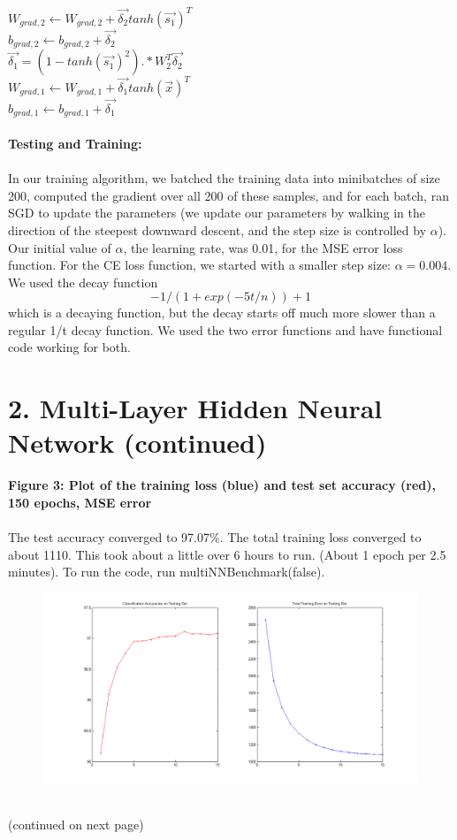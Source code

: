 \documentclass[11pt]{article}
\begin{document}
$ W_{grad, 2} \leftarrow W_{grad,2} + \vec{\delta_{2}} tanh(\vec{s_1})^T $ \\
$ b_{grad, 2} \leftarrow b_{grad,2} + \vec{\delta_{2}} $ \\
$ \vec{\delta_1} = (1 - tanh(\vec{s_1})^2) .* W_{2}^T \vec{\delta_{2}} $ \\
$ W_{grad, 1} \leftarrow W_{grad,1} + \vec{\delta_{1}} tanh(\vec{x})^T $ \\
$ b_{grad, 1} \leftarrow b_{grad,1} + \vec{\delta_{1}} $ 
\\\\
\textbf{Testing and Training:}
\\\\
In our training algorithm, we batched the training data into minibatches of size 200, computed the gradient over all 200 of these samples, and for each batch, ran SGD to update the parameters (we update our parameters by walking in the direction of the steepest downward descent, and the step size is controlled by $\alpha$). Our initial value of $\alpha$, the learning rate, was 0.01, for the MSE error loss function. For the CE loss function, we started with a smaller step size: $\alpha = 0.004$. We used the decay function $$ -1 / (1 + exp(-5t / n)) + 1 $$ which is a decaying function, but the decay starts off much more slower than a regular 1/t decay function. We used the two error functions and have functional code working for both.
\newpage
\section*{2. Multi-Layer Hidden Neural Network (continued)}
\textbf{Figure 3: Plot of the training loss (blue) and test set accuracy (red), 150 epochs, MSE error}  \\\\
The test accuracy converged to 97.07\%. The total training loss converged to about 1110. This took about a little over 6 hours to run. (About 1 epoch per 2.5 minutes). To run the code, run multiNNBenchmark(false).
\\
\begin{figure}[ht!]
\centering
\includegraphics[width=180mm]{plots/finalp2mse.png}
\label{overflow}
\end{figure}
\\
(continued on next page)
\newpage
\end{document}
